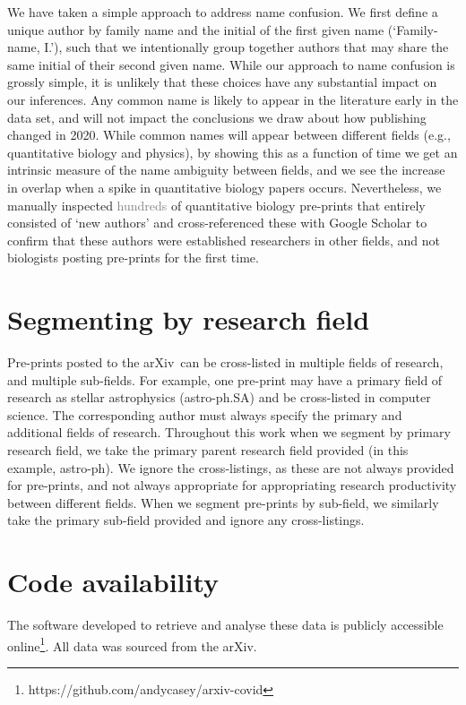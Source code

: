 \documentclass{nature}
\newcommand{\todo}[1]{\textcolor{gray}{#1}}
\newcommand{\arxiv}{arXiv}
\begin{document}
\begin{methods}
We have taken a simple approach to address name confusion. We first define a unique author by family name and the initial of the first given name (`Family-name, I.'), such that we intentionally group together authors that may share the same initial of their second given name. While our approach to name confusion is grossly simple, it is unlikely that these choices have any substantial impact on our inferences. Any common name is likely to appear in the literature early in the data set, and will not impact the conclusions we draw about how publishing changed in 2020. While common names will appear between different fields (e.g., quantitative biology and physics), by showing this as a function of time we get an intrinsic measure of the name ambiguity between fields, and we see the increase in overlap when a spike in quantitative biology papers occurs. 
Nevertheless, we manually inspected \todo{hundreds} of quantitative biology pre-prints that entirely consisted of `new authors' and cross-referenced these with Google Scholar to confirm that these authors were established researchers in other fields, and not biologists posting pre-prints for the first time.

\section*{Segmenting by research field}

Pre-prints posted to the \arxiv\ can be cross-listed in multiple fields of research, and multiple sub-fields. For example, one pre-print may have a primary field of research as stellar astrophysics (astro-ph.SA) and be cross-listed in computer science. The corresponding author must always specify the primary and additional fields of research. Throughout this work when we segment by primary research field, we take the primary parent research field provided (in this example, astro-ph). We ignore the cross-listings, as these are not always provided for pre-prints, and not always appropriate for appropriating research productivity between different fields. When we segment pre-prints by sub-field, we similarly take the primary sub-field provided and ignore any cross-listings.

\section*{Code availability}
The software developed to retrieve and analyse these data is publicly accessible online\footnote{https://github.com/andycasey/arxiv-covid}. All data was sourced from the \arxiv.

\end{methods}




\end{document}
